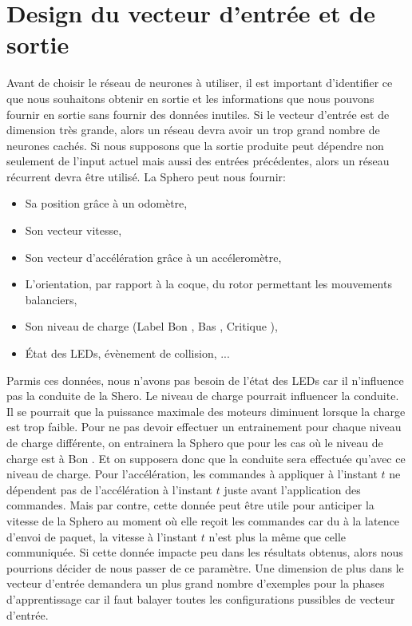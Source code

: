 \documentclass[12pt,a4paper,oneside, titlepage]{article}
\begin{document}
\section{Design du vecteur d'entrée et de sortie}
Avant de choisir le réseau de neurones à utiliser, il est important d'identifier ce que nous souhaitons obtenir en sortie et les informations que nous pouvons fournir en sortie sans fournir des données inutiles.
Si le vecteur d'entrée est de dimension très grande, alors un réseau \rbf devra avoir un trop grand nombre de neurones cachés\cite{Gauthier}.
Si nous supposons que la sortie produite peut dépendre non seulement de l'input actuel mais aussi des entrées précédentes, alors un réseau récurrent devra être utilisé.
La Sphero peut nous fournir:
\begin{itemize}%
 \item Sa position grâce à un odomètre,
 \item Son vecteur vitesse,
 \item Son vecteur d'accélération grâce à un accéleromètre,
 \item L'orientation, par rapport à la coque, du rotor permettant les mouvements balanciers,
 \item Son niveau de charge (Label \og Bon \fg, \og Bas \fg, \og Critique \fg),%
 \item État des LEDs, évènement de collision, ... %
\end{itemize}
Parmis ces données, nous n'avons pas besoin de l'état des LEDs car il n'influence pas la conduite de la Shero.
Le niveau de charge pourrait influencer la conduite.
Il se pourrait que la puissance maximale des moteurs diminuent lorsque la charge est trop faible.
Pour ne pas devoir effectuer un entrainement pour chaque niveau de charge différente, on entrainera la Sphero que pour les cas où le niveau de charge est à \og Bon \fg.
Et on supposera donc que la conduite sera effectuée qu'avec ce niveau de charge.
Pour l'accélération, les commandes à appliquer à l'instant $t$ ne dépendent pas de l'accélération à l'instant $t$ juste avant l'application des commandes.
Mais par contre, cette donnée peut être utile pour anticiper la vitesse de la Sphero au moment où elle reçoit les commandes car du à la latence d'envoi de paquet, la vitesse à l'instant $t$ n'est plus la même que celle communiquée.
Si cette donnée impacte peu dans les résultats obtenus, alors nous pourrions décider de nous passer de ce paramètre.
Une dimension de plus dans le vecteur d'entrée demandera un plus grand nombre d'exemples pour la phases d'apprentissage car il faut balayer toutes les configurations pussibles de vecteur d'entrée.
\end{document}
